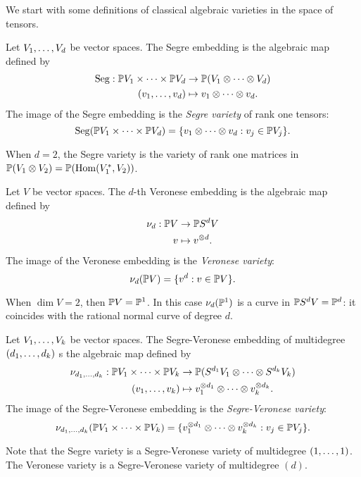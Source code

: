 We start with some definitions of classical algebraic varieties in the space of tensors.
\begin{definition}
\label{classicalAG-definition-Segre}
Let $V_1 , \ldots , V_d$ be vector spaces. The Segre embedding is the algebraic map defined by 
\begin{align*}
\mathrm{Seg}: \mathbb{P} V_1 \times \cdots \times \mathbb{P} V_d &\to \mathbb{P} (V_1 \otimes \cdots \otimes V_d) \\
(v_1 , \ldots , v_d) &\mapsto v_1 \otimes \cdots \otimes v_d.
\end{align*}
The image of the Segre embedding is the \emph{Segre variety} of rank one tensors:
\[
\mathrm{Seg}( \mathbb{P} V_1 \times \cdots \times \mathbb{P} V_d) =\{ v_1 \otimes \cdots \otimes v_d : v_j \in \mathbb{P} V_j\}.
\]
\end{definition}
When $d = 2$, the Segre variety is the variety of rank one matrices in $\mathbb{P} (V_1 \otimes V_2) = \mathbb{P} ( \operatorname{Hom}(V_1^* , V_2))$.

\begin{definition}
\label{classicalAG-definition-Veronese}
Let $V$ be vector spaces. The $d$-th Veronese embedding is the algebraic map defined by 
\begin{align*}
\nu_d : \mathbb{P} V &\to \mathbb{P} S^d V \\
v &\mapsto v^{\otimes d}.
\end{align*}
The image of the Veronese embedding is the \emph{Veronese variety}:
\[
\nu_d( \mathbb{P} V ) =\{ v^d :  v \in \mathbb{P} V\}.
\]
\end{definition}
When $\dim V= 2$, then $\mathbb{P} V = \mathbb{P}^1$. In this case $\nu_d( \mathbb{P}^1)$ is a curve in $\mathbb{P} S^d V = \mathbb{P}^d$: it coincides with the rational normal curve of degree $d$.

\begin{definition}
\label{classicalAG-definition-SegreVeronese}
Let $V_1 , \ldots , V_k$ be vector spaces. The Segre-Veronese embedding of multidegree $(d_1 , \ldots , d_k)$ s the algebraic map defined by 
\begin{align*}
\nu_{d_1 , \ldots , d_k} : \mathbb{P} V_1 \times \cdots \times \mathbb{P} V_k &\to \mathbb{P} (S^{d_1} V_1 \otimes \cdots \otimes S^{d_k} V_k) \\
(v_1 , \ldots , v_k) &\mapsto v_1^{\otimes d_1} \otimes \cdots \otimes v_k^{\otimes d_k}.
\end{align*}
The image of the Segre-Veronese embedding is the \emph{Segre-Veronese variety}:
\[
\nu_{d_1 , \ldots , d_k}( \mathbb{P} V_1 \times \cdots \times \mathbb{P} V_k ) =\{ v_1^{\otimes d_1} \otimes \cdots \otimes v_k^{\otimes d_k} :  v_j \in \mathbb{P} V_j\}.
\]
\end{definition}

Note that the Segre variety is a Segre-Veronese variety of multidegree $(1 , \ldots , 1)$. The Veronese variety is a Segre-Veronese variety of multidegree $(d)$.

